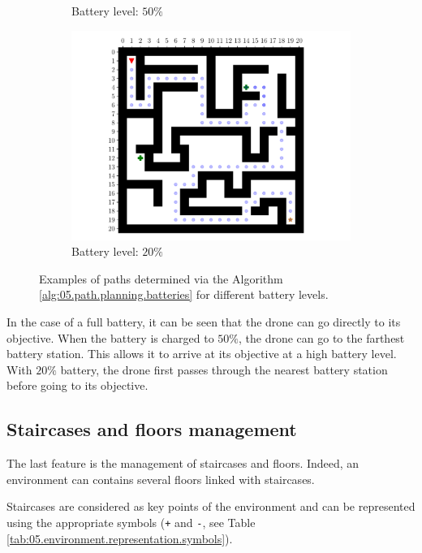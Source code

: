 \begin{figure}[H]
\begin{subfigure}[b]{0.32\textwidth}
        \caption{Battery level: $50\%$}
    \end{subfigure}
    \hfill
    \begin{subfigure}[b]{0.32\textwidth}
        \centering
        \includegraphics[width=\textwidth]{resources/pdf/05/complex-environment/b20.pdf}
        \caption{Battery level: $20\%$}
    \end{subfigure}
    \caption{Examples of paths determined via the Algorithm \ref{alg:05.path.planning.batteries} for different battery levels.}
    \label{fig:05.path.planning.batteries.examples}
\end{figure}

In the case of a full battery, it can be seen that the drone can go directly to its objective. When the battery is charged to $50\%$, the drone can go to the farthest battery station. This allows it to arrive at its objective at a high battery level. With $20\%$ battery, the drone first passes through the nearest battery station before going to its objective.

\subsection{Staircases and floors management}\label{sec:05.staircases.floors.management}

The last feature is the management of staircases and floors. Indeed, an environment can contains several floors linked with staircases.

Staircases are considered as key points of the environment and can be represented using the appropriate symbols (\texttt{+} and \texttt{-}, see Table \ref{tab:05.environment.representation.symbols}).

